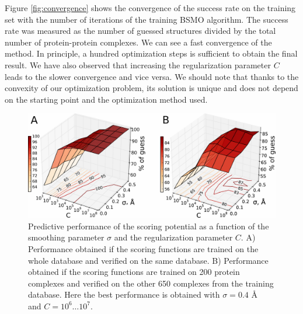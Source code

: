 Figure \ref{fig:convergence} shows the convergence of the success rate on the training set with the number of iterations of the training BSMO algorithm.
The success rate was measured as the number of guessed structures divided by the total number of protein-protein complexes. 
We can see a fast convergence of the method. In principle, a hundred optimization steps is sufficient to obtain the final result. 
We have also observed that  increasing  the regularization parameter $C$ leads
to the slower convergence and vice versa. 
We should note that thanks to the convexity of our optimization problem, its solution is unique and does not depend on the starting point and the optimization method used.


\begin{figure}[H]
\begin{center}
\includegraphics[scale=0.4]{Scoring/Fig/2plots_final}
\caption[Predictive performance of the scoring potential as a function of the smoothing parameter $\sigma$ and the regularization parameter $C$]{
Predictive performance of the scoring potential as a function of the smoothing parameter $\sigma$ and the regularization parameter $C$. 
A) Performance obtained if the scoring functions are trained on the whole database and verified on the same database. 
B) Performance obtained if the scoring functions are trained on 200 protein complexes and verified on the other 650 complexes from the training database.
Here the best performance is obtained with $\sigma=0.4$ \AA~ and $C=10^6\dots10^7$.
}
\label{fig:crossVal} 
\end{center}
\end{figure}

